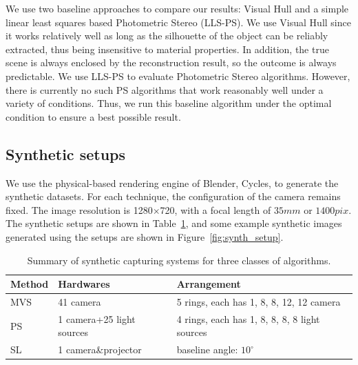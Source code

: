 We use two baseline approaches to compare our results: Visual Hull and a simple linear least squares based Photometric Stereo (LLS-PS). We use Visual Hull since it works relatively well as long as the silhouette of the object can be reliably extracted, thus being insensitive to material properties. In addition, the true scene is always enclosed by the reconstruction result, so the outcome is always predictable. We use LLS-PS to evaluate Photometric Stereo algorithms. However, there is currently no such PS algorithms that work reasonably well under a variety of conditions. Thus, we run this baseline algorithm under the optimal condition to ensure a best possible result.

\subsection{Synthetic setups}
We use the physical-based rendering engine of Blender, Cycles, to generate the synthetic datasets. For each technique, the configuration of the camera remains fixed. The image resolution is 1280$\times$720, with a focal length of $35mm$ or $1400pix$. The synthetic setups are shown in Table~\ref{tab:synth_setup}, and some example synthetic images generated using the setups are shown in Figure~\ref{fig:synth_setup}.
\begin{table}[!htbp]
\centering
\begin{tabular}{lll}
\toprule
Method & Hardwares & Arrangement\\
\midrule
MVS & 41 camera & 5 rings, each has 1, 8, 8, 12, 12 camera\\
PS & 1 camera+25 light sources & 4 rings, each has 1, 8, 8, 8, 8 light sources\\
SL & 1 camera\&projector & baseline angle: $10^\circ$\\
\bottomrule
\end{tabular}
\caption{Summary of synthetic capturing systems for three classes of algorithms.}
\label{tab:synth_setup}
\end{table}

